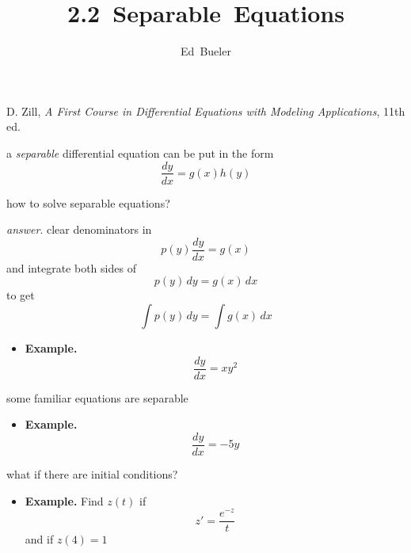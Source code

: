 \documentclass{beamer}
\title{\mbox{2.2 Separable Equations} \\ \phantom{foo}}
\date{%
}
\author{\mbox{Ed Bueler}}
\institute{\scriptsize Dept.~of Mathematics and Statistics \\ UAF}
\begin{document}
\begin{rightframe}[]
\titlepage

\vspace{30mm}
\tiny {\color{blue!30} D. Zill, \emph{A First Course in Differential Equations with Modeling Applications}, 11th ed.}
\end{rightframe}

\begin{rightframe}[]
a \emph{separable} differential equation can be put in the form
        $$\frac{dy}{dx} = g(x) h(y)$$
\end{rightframe}

\begin{rightframe}[]
how to solve separable equations?

\emph{answer}.  clear denominators in
    $$p(y) \frac{dy}{dx} = g(x)$$
and integrate both sides of 
    $$p(y)\,dy = g(x)\, dx$$
to get
    $$\int p(y)\,dy = \int g(x)\, dx$$
\end{rightframe}

\begin{rightframe}[]
\begin{itemize}
\item \textbf{Example.}
    $$\frac{dy}{dx} = x y^2$$
\end{itemize}
\end{rightframe}

\begin{rightframe}[]
some familiar equations are separable
\begin{itemize}
\item \textbf{Example.}
    $$\frac{dy}{dx} = - 5 y$$
\end{itemize}
\end{rightframe}

\begin{rightframe}[]
what if there are initial conditions?
\begin{itemize}
\item \textbf{Example.}  Find $z(t)$ if
    $$z' = \frac{e^{-z}}{t}$$
and if $z(4)=1$
\end{itemize}
\end{rightframe}
\end{document}
